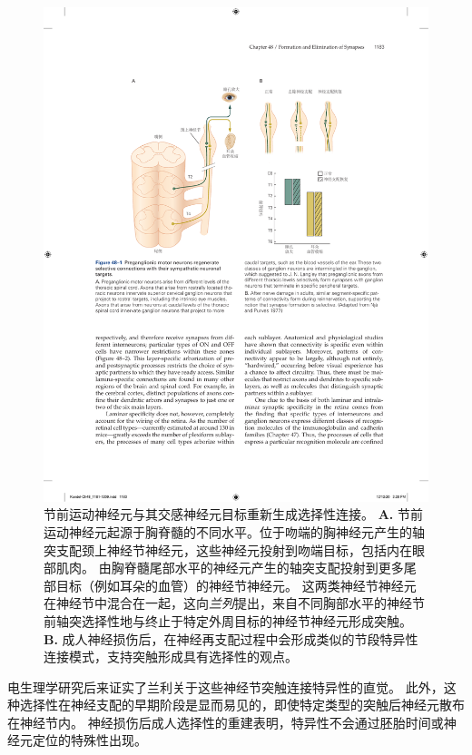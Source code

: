 \begin{figure}[htbp]
	\centering
	\includegraphics[width=1.0\linewidth]{chap48/fig_48_1}
	\caption{节前运动神经元与其交感神经元目标重新生成选择性连接。
		\textbf{A.} 节前运动神经元起源于胸脊髓的不同水平。位于吻端的胸神经元产生的轴突支配颈上神经节神经元，这些神经元投射到吻端目标，包括内在眼部肌肉。
		由胸脊髓尾部水平的神经元产生的轴突支配投射到更多尾部目标（例如耳朵的血管）的神经节神经元。
		这两类神经节神经元在神经节中混合在一起，这向\textit{兰列}提出，来自不同胸部水平的神经节前轴突选择性地与终止于特定外周目标的神经节神经元形成突触。
		\textbf{B.} 成人神经损伤后，在神经再支配过程中会形成类似的节段特异性连接模式，支持突触形成具有选择性的观点\cite{njaa1977specific}。}
	\label{fig:48_1}
\end{figure}


电生理学研究后来证实了兰利关于这些神经节突触连接特异性的直觉。
此外，这种选择性在神经支配的早期阶段是显而易见的，即使特定类型的突触后神经元散布在神经节内。
神经损伤后成人选择性的重建表明，特异性不会通过胚胎时间或神经元定位的特殊性出现。



